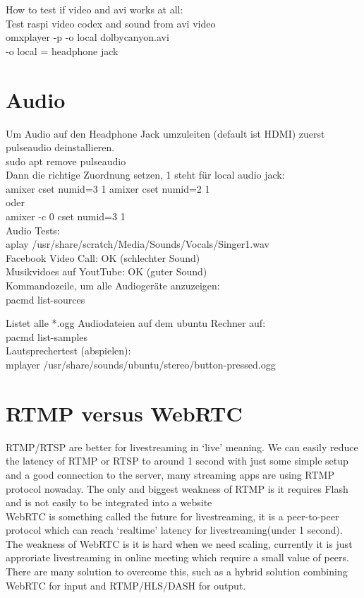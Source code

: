 How to test if video and avi works at all:\\
Test raspi video codex and sound from avi video\\
omxplayer -p -o local dolbycanyon.avi\\
-o local = headphone jack

\section{Audio}
Um Audio auf den Headphone Jack umzuleiten (default ist HDMI) zuerst pulseaudio deinstallieren.\\
sudo apt remove pulseaudio\\

Dann die richtige Zuordnung setzen, 1 steht für local audio jack:\\
amixer cset numid=3 1
amixer cset numid=2 1\\
oder \\
amixer -c 0 cset numid=3 1\\

Audio Tests:\\
aplay /usr/share/scratch/Media/Sounds/Vocals/Singer1.wav\\
Facebook Video Call: OK (schlechter Sound)\\
Musikvidoes auf YoutTube: OK (guter Sound)\\

Kommandozeile, um alle Audiogeräte anzuzeigen:\\
pacmd list-sources

Listet alle *.ogg Audiodateien auf dem ubuntu Rechner auf:\\
pacmd list-samples\\
Lautsprechertest (abspielen):\\
mplayer /usr/share/sounds/ubuntu/stereo/button-pressed.ogg 


\section{RTMP versus WebRTC}

RTMP/RTSP are better for livestreaming in ‘live’ meaning. We can easily reduce the latency of RTMP or RTSP to around 1 second with just some simple setup and a good connection to the server, many streaming apps are using RTMP protocol nowaday. The only and biggest weakness of RTMP is it requires Flash and is not easily to be integrated into a website\\

WebRTC is something called the future for livestreaming, it is a peer-to-peer protocol which can reach ‘realtime’ latency for livestreaming(under 1 second). The weakness of WebRTC is it is hard when we need scaling, currently it is just approriate livestreaming in online meeting which require a small value of peers. There are many solution to overcome this, such as a hybrid solution combining WebRTC for input and RTMP/HLS/DASH for output.
